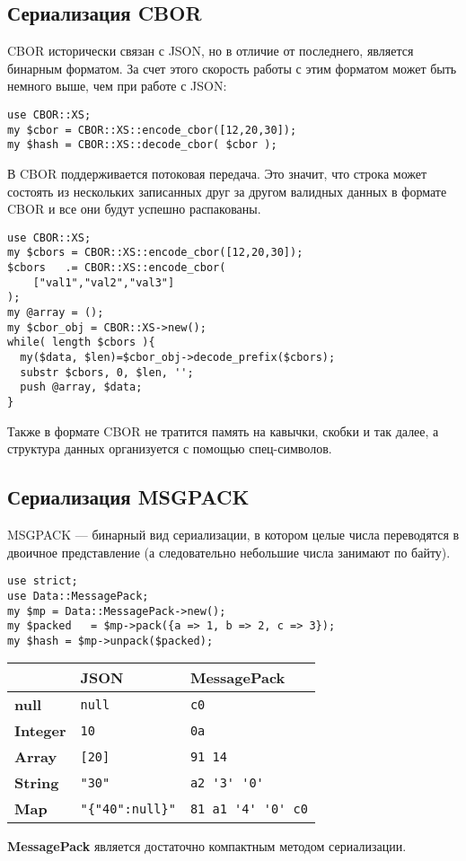 \subsection{Сериализация CBOR}  %
CBOR исторически связан с JSON, но в отличие от последнего, является бинарным форматом. За счет этого скорость работы с этим форматом может быть немного выше, чем при работе с JSON:
\begin{verbatim}
use CBOR::XS;
my $cbor = CBOR::XS::encode_cbor([12,20,30]);
my $hash = CBOR::XS::decode_cbor( $cbor );
\end{verbatim}
В CBOR поддерживается потоковая передача. Это значит, что строка может состоять из нескольких записанных друг за другом валидных данных в формате CBOR и все они будут успешно распакованы.
\begin{verbatim}
use CBOR::XS;
my $cbors = CBOR::XS::encode_cbor([12,20,30]);
$cbors   .= CBOR::XS::encode_cbor(
    ["val1","val2","val3"]
);
my @array = ();
my $cbor_obj = CBOR::XS->new();
while( length $cbors ){
  my($data, $len)=$cbor_obj->decode_prefix($cbors);
  substr $cbors, 0, $len, '';
  push @array, $data;
}
\end{verbatim}
Также в формате CBOR не тратится память на кавычки, скобки и так далее, а структура данных организуется с помощью спец-символов.

\subsection{Сериализация MSGPACK}
MSGPACK --- бинарный вид сериализации, в котором целые числа переводятся в двоичное представление (а следовательно небольшие числа занимают по байту).
\begin{verbatim}
use strict;
use Data::MessagePack;
my $mp = Data::MessagePack->new();
my $packed   = $mp->pack({a => 1, b => 2, c => 3});
my $hash = $mp->unpack($packed);
\end{verbatim}
\begin{table}[H]{ \renewcommand{\arraystretch}{1.4} \centering
  \begin{tabular}{|p{3cm}|p{3cm}|p{3cm}|}\hline
  \cellcolor{red!3}&    \cellcolor{red!3}
                        \textbf{JSON}     &   \cellcolor{red!3}
                                              \textbf{MessagePack}  \\ \hline
  \cellcolor{red!3}
  \textbf{null}    & \verb|null|          &\verb|c0|                \\ \hline
  \cellcolor{red!3}
  \textbf{Integer} & \verb|10|            &\verb|0a|                \\ \hline
  \cellcolor{red!3}
  \textbf{Array}   & \verb|[20]|          &\verb|91 14|             \\ \hline
  \cellcolor{red!3}
  \textbf{String}  & \verb|"30"|          &\verb|a2 '3' '0'|        \\ \hline
  \cellcolor{red!3}
  \textbf{Map}     & \verb|"{"40":null}"| &\verb|81 a1 '4' '0' c0|  \\ \hline
\end{tabular} }
\end{table}
\textbf{MessagePack} является достаточно компактным методом сериализации.


